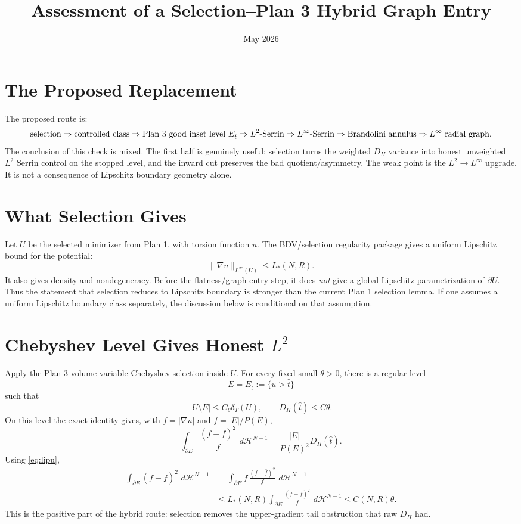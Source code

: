 \documentclass[11pt]{article}
\title{Assessment of a Selection--Plan 3 Hybrid Graph Entry}
\author{}
\date{May 2026}
\newcommand{\dT}{\delta_T}
\newcommand{\Et}{E_{\hat t}}
\newcommand{\dH}{\,d\mathcal H^{N-1}}
\begin{document}
\maketitle

\section{The Proposed Replacement}

The proposed route is:
\[
\hbox{selection}
\Rightarrow
\hbox{controlled class}
\Rightarrow
\hbox{Plan 3 good inset level } \Et
\Rightarrow
L^2\hbox{-Serrin}
\Rightarrow
L^\infty\hbox{-Serrin}
\Rightarrow
\hbox{Brandolini annulus}
\Rightarrow
L^\infty\hbox{ radial graph.}
\]
The conclusion of this check is mixed.  The first half is genuinely useful:
selection turns the weighted \(D_H\) variance into honest unweighted \(L^2\)
Serrin control on the stopped level, and the inward cut preserves the bad
quotient/asymmetry.  The weak point is the \(L^2\to L^\infty\) upgrade.  It is
not a consequence of Lipschitz boundary geometry alone.

\section{What Selection Gives}

Let \(U\) be the selected minimizer from Plan 1, with torsion function \(u\).
The BDV/selection regularity package gives a uniform Lipschitz bound for the
potential:
\[
   \|\nabla u\|_{L^\infty(U)}\le L_*(N,R).
   \tag{2.1}\label{eq:lipu}
\]
It also gives density and nondegeneracy.  Before the flatness/graph-entry
step, it does \emph{not} give a global Lipschitz parametrization of
\(\partial U\).  Thus the statement that selection reduces to Lipschitz
boundary is stronger than the current Plan 1 selection lemma.  If one assumes
a uniform Lipschitz boundary class separately, the discussion below is
conditional on that assumption.

\section{Chebyshev Level Gives Honest \(L^2\)}

Apply the Plan 3 volume-variable Chebyshev selection inside \(U\).  For every
fixed small \(\theta>0\), there is a regular level
\[
   E=\Et:=\{u>\hat t\}
\]
such that
\[
   |U\setminus E|\le C_\theta \dT(U),
   \qquad
   D_H(\hat t)\le C\theta.
   \tag{3.1}\label{eq:good-level}
\]
On this level the exact identity gives, with \(f=|\nabla u|\) and
\(\bar f=|E|/P(E)\),
\[
   \int_{\partial E}\frac{(f-\bar f)^2}{f}\,\dH
      =
      \frac{|E|}{P(E)^2}D_H(\hat t).
   \tag{3.2}
\]
Using \eqref{eq:lipu},
\[
\begin{aligned}
   \int_{\partial E}(f-\bar f)^2\,\dH
      &=
      \int_{\partial E}
      f\,\frac{(f-\bar f)^2}{f}\,\dH  \\
      &\le L_*(N,R)
      \int_{\partial E}\frac{(f-\bar f)^2}{f}\,\dH
      \le C(N,R)\theta.
\end{aligned}
\tag{3.3}\label{eq:l2serrin}
\]
This is the positive part of the hybrid route: selection removes the
upper-gradient tail obstruction that raw \(D_H\) had.
\end{document}
